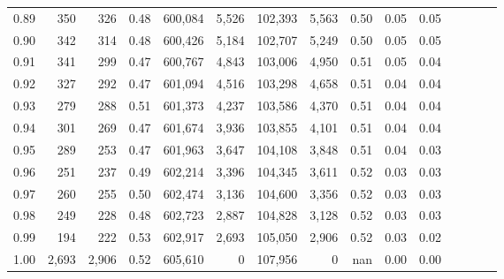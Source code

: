 \begin{tabular}{rrrcrrrrrrrrrrr}
0.89 &     350 &    326 &                                       0.48 &  600,084 &    5,526 &  102,393 &    5,563 &  0.50 &  0.05 &                         0.05 \\
0.90 &     342 &    314 &                                       0.48 &  600,426 &    5,184 &  102,707 &    5,249 &  0.50 &  0.05 &                         0.05 \\
0.91 &     341 &    299 &                                       0.47 &  600,767 &    4,843 &  103,006 &    4,950 &  0.51 &  0.05 &                         0.04 \\
0.92 &     327 &    292 &                                       0.47 &  601,094 &    4,516 &  103,298 &    4,658 &  0.51 &  0.04 &                         0.04 \\
0.93 &     279 &    288 &                                       0.51 &  601,373 &    4,237 &  103,586 &    4,370 &  0.51 &  0.04 &                         0.04 \\
0.94 &     301 &    269 &                                       0.47 &  601,674 &    3,936 &  103,855 &    4,101 &  0.51 &  0.04 &                         0.04 \\
0.95 &     289 &    253 &                                       0.47 &  601,963 &    3,647 &  104,108 &    3,848 &  0.51 &  0.04 &                         0.03 \\
0.96 &     251 &    237 &                                       0.49 &  602,214 &    3,396 &  104,345 &    3,611 &  0.52 &  0.03 &                         0.03 \\
0.97 &     260 &    255 &                                       0.50 &  602,474 &    3,136 &  104,600 &    3,356 &  0.52 &  0.03 &                         0.03 \\
0.98 &     249 &    228 &                                       0.48 &  602,723 &    2,887 &  104,828 &    3,128 &  0.52 &  0.03 &                         0.03 \\
0.99 &     194 &    222 &                                       0.53 &  602,917 &    2,693 &  105,050 &    2,906 &  0.52 &  0.03 &                         0.02 \\
1.00 &   2,693 &  2,906 &                                       0.52 &  605,610 &        0 &  107,956 &        0 &   nan &  0.00 &                         0.00 \\
\bottomrule
\end{tabular}
